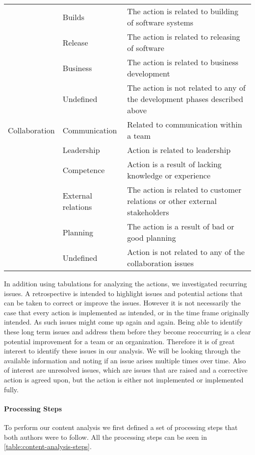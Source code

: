 \begin{table}[h]
\begin{center}
\begin{adjustbox}{width=\textwidth, totalheight=0.9\textheight, keepaspectratio}
\begin{tabular}{| l | l | p{} |}
			& Builds & The action is related to building of software systems \\ \cline{2-3}
			& Release & The action is related to releasing of software \\ \cline{2-3}
			& Business & The action is related to business development \\ \cline{2-3}
			& Undefined & The action is not related to any of the development phases described above \\ 
			\hline
			Collaboration & Communication & Related to communication within a team \\ \cline{2-3}
			& Leadership & Action is related to leadership \\ \cline{2-3}
			& Competence & Action is a result of lacking knowledge or experience \\ \cline{2-3}
			& External relations & The action is related to customer relations or other external stakeholders \\ \cline{2-3}
			& Planning & The action is a result of bad or good planning \\ \cline{2-3}
			& Undefined & Action is not related to any of the collaboration issues \\
			\hline
			\end{tabular}
		\end{adjustbox}
	\end{center}
\end{table}

In addition using tabulations for analyzing the actions, we investigated recurring issues. A retrospective is intended to highlight issues and potential actions that can be taken to correct or improve the issues. However it is not necessarily the case that every action is implemented as intended, or in the time frame originally intended. As such issues might come up again and again. Being able to identify these long term issues and address them before they become reoccurring is a clear potential improvement for a team or an organization. Therefore it is of great interest to identify these issues in our analysis. We will be looking through the available information and noting if an issue arises multiple times over time. Also of interest are unresolved issues, which are issues that are raised and a corrective action is agreed upon, but the action is either not implemented or implemented fully.

\paragraph{Processing Steps}
To perform our content analysis we first defined a set of processing steps that both authors were to follow. All the processing steps can be seen in \autoref{table:content-analysis-steps}.

